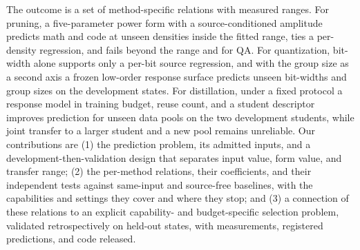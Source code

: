 The outcome is a set of method-specific relations with measured
ranges. For pruning, a five-parameter power form with a
source-conditioned amplitude predicts math and code at unseen
densities inside the fitted range, ties a per-density regression, and
fails beyond the range and for QA. For quantization, bit-width alone
supports only a per-bit source regression, and with the group size as
a second axis a frozen low-order response surface predicts unseen
bit-widths and group sizes on the development states. For
distillation, under a fixed protocol a response model in training
budget, reuse count, and a student descriptor improves prediction for
unseen data pools on the two development students, while joint
transfer to a larger student and a new pool remains unreliable. Our
contributions are (1) the prediction problem, its admitted inputs, and
a development-then-validation design that separates input value, form
value, and transfer range; (2) the per-method relations, their
coefficients, and their independent tests against same-input and
source-free baselines, with the capabilities and settings they cover
and where they stop; and (3) a connection of these relations to an
explicit capability- and budget-specific selection problem, validated
retrospectively on held-out states, with measurements, registered
predictions, and code released.
